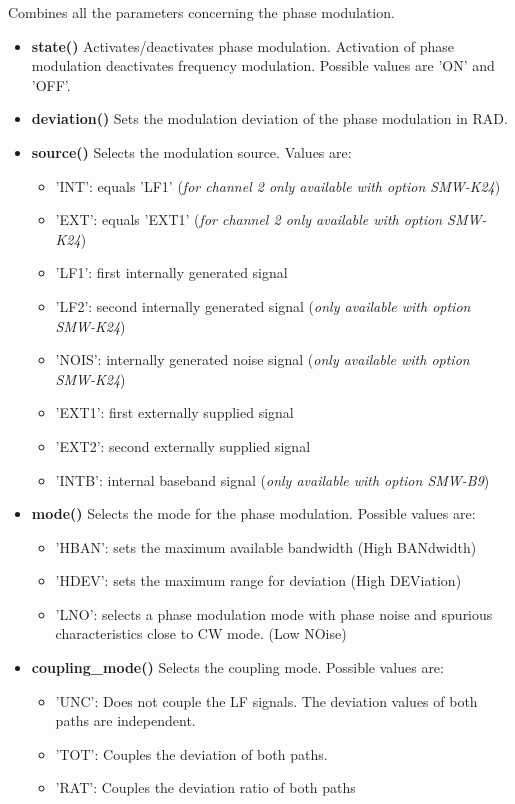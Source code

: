 \documentclass[11pt]{article} %
\begin{document}
Combines all the parameters concerning the phase modulation.
\begin{itemize}
\item {\bf state()} Activates/deactivates phase modulation. Activation of phase modulation deactivates frequency modulation. Possible values are 'ON' and 'OFF'.
\item {\bf deviation()} Sets the modulation deviation of the phase modulation in RAD.
\item {\bf source()} Selects the modulation source. Values are:
	\begin{itemize}[]
	\item 'INT': equals 'LF1' ({\it for channel 2 only available with option SMW-K24})
	\item 'EXT': equals 'EXT1' ({\it for channel 2 only available with option SMW-K24})
	\item 'LF1': first internally generated signal
	\item 'LF2': second internally generated signal ({\it only available with option SMW-K24})
	\item 'NOIS': internally generated noise signal ({\it only available with option SMW-K24})
	\item 'EXT1': first externally supplied signal
	\item 'EXT2': second externally supplied signal
	\item 'INTB': internal baseband signal ({\it only available with option SMW-B9})
	\end{itemize}
\item {\bf mode()} Selects the mode for the phase modulation. Possible values are:
	\begin{itemize}[]
	\item 'HBAN': sets the maximum available bandwidth (High BANdwidth)
	\item 'HDEV': sets the maximum range for deviation (High DEViation)
	\item 'LNO': selects a phase modulation mode with phase noise and spurious characteristics close to CW mode. (Low NOise)
	\end{itemize}
\item {\bf coupling\_mode()} Selects the coupling mode. Possible values are:
	\begin{itemize}[]
	\item 'UNC': Does not couple the LF signals. The deviation values of both paths are independent.
	\item 'TOT': Couples the deviation of both paths.
	\item 'RAT': Couples the deviation ratio of both paths

\end{itemize}
\end{itemize}
\end{document}

